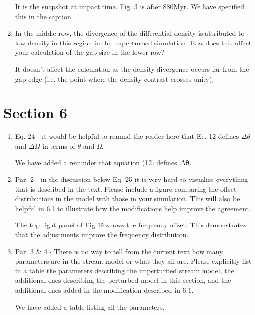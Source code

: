 \documentclass{article}
\begin{document}
\begin{enumerate}
{\color{red} It is the snapshot at impact time. Fig. 3 is after $880\mathrm{Myr}$. We have specified this in the caption.}

\item In the middle row, the divergence of the differential density is attributed to low density in
this region in the unperturbed simulation. How does this affect your calculation of the
gap size in the lower row?

{\color{red} It doesn't affect the calculation as the density divergence occurs far from the gap edge (i.e. the point where the density contrast crosses unity).}

\end{enumerate}
\section{Section 6}
\begin{enumerate}
\item Eq. 24 - it would be helpful to remind the reader here that Eq. 12 defines $\Delta \theta$
and $\Delta \Omega$ in terms of $\theta$ and $\Omega$.

{\color{red} We have added a reminder that equation (12) defines $\Delta\boldsymbol{\theta}$.}

\item Par. 2 - in the discussion below Eq. 25 it is very hard to visualize everything that is
described in the text. Please include a figure comparing the offset distributions in the
model with those in your simulation. This will also be helpful in 6.1 to illustrate how the
modifications help improve the agreement.

{\color{red} The top right panel of Fig 15 shows the frequency offset. This demonstrates that the adjustments improve the frequency distribution.}

\item Par. 3 \& 4 - There is no way to tell from the current text how many parameters are in the
stream model or what they all are. Please explicitly list in a table the parameters
describing the unperturbed stream model, the additional ones describing the perturbed
model in this section, and the additional ones added in the modification described in 6.1.

{\color{red} We have added a table listing all the parameters.}
\end{enumerate}
\end{document}
